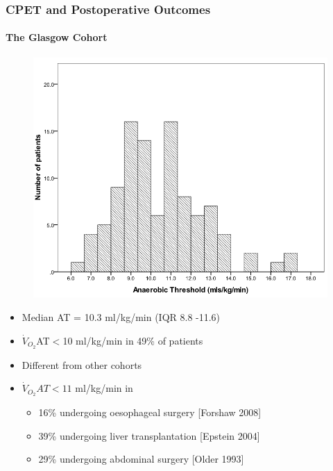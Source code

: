 \documentclass{beamer}
\begin{document}
\begin{frame}
	\frametitle{CPET and Postoperative Outcomes}
	\framesubtitle{The Glasgow Cohort}
	\begin{figure}
		\centering
		\includegraphics[height=0.35\textheight]{../Figures/cpet_outcomes_dist_of_AT}
	\end{figure}

	\begin{itemize}
		\item Median AT = 10.3 ml/kg/min (IQR 8.8 -11.6)
		\item $\dot{V}_{O_2}$AT$<$10 ml/kg/min in 49\% of patients
		\item Different from other cohorts
		\item $\dot{V}_{O_2}AT<11$ ml/kg/min in
		\begin{itemize}
			\item 16\% undergoing oesophageal surgery [Forshaw 2008]
			\item 39\% undergoing liver transplantation [Epstein 2004]
			\item 29\% undergoing abdominal surgery [Older 1993]
		\end{itemize}
	\end{itemize}
\end{frame}
\end{document}
